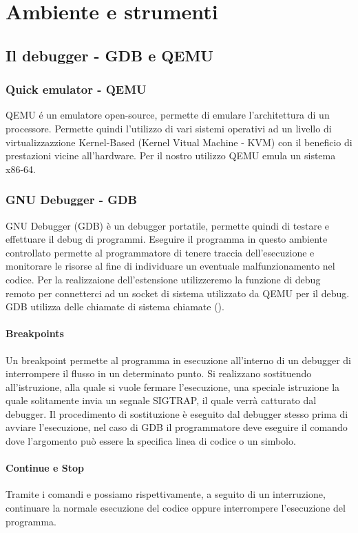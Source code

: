 \chapter{Ambiente e strumenti}
\section{Il debugger - GDB e QEMU}
\subsection{Quick emulator - QEMU}
QEMU é un emulatore open-source, permette di emulare l'architettura di un processore. Permette quindi l'utilizzo di vari sistemi operativi ad un livello di virtualizzazzione Kernel-Based (Kernel Vitual Machine - KVM) con il beneficio di prestazioni vicine all'hardware. Per il nostro utilizzo QEMU emula un sistema x86-64. 
\subsection{GNU Debugger - GDB}
GNU Debugger (GDB) è un debugger portatile, permette quindi di testare e effettuare il debug di programmi. Eseguire il programma in questo ambiente controllato permette al programmatore di tenere traccia dell'esecuzione e monitorare le risorse al fine di individuare un eventuale malfunzionamento nel codice. Per la realizzaione dell'estensione utilizzeremo la funzione di debug remoto per connetterci ad un socket di sistema utilizzato da QEMU per il debug. GDB utilizza delle chiamate di sistema chiamate  (). 

\subsubsection{Breakpoints}
Un breakpoint permette al programma in esecuzione all'interno di un debugger di interrompere il flusso in un determinato punto. Si realizzano sostituendo all'istruzione, alla quale si vuole fermare l'esecuzione, una speciale istruzione la quale solitamente invia un segnale SIGTRAP, il quale verrà catturato dal debugger. Il procedimento di sostituzione è eseguito dal debugger stesso prima di avviare l'esecuzione, nel caso di GDB il programmatore deve eseguire il comando  dove l'argomento può essere la specifica linea di codice o un simbolo. 

\subsubsection{Continue e Stop}
Tramite i comandi  e  possiamo rispettivamente, a seguito di un interruzione, continuare la normale esecuzione del codice oppure interrompere l'esecuzione del programma.

